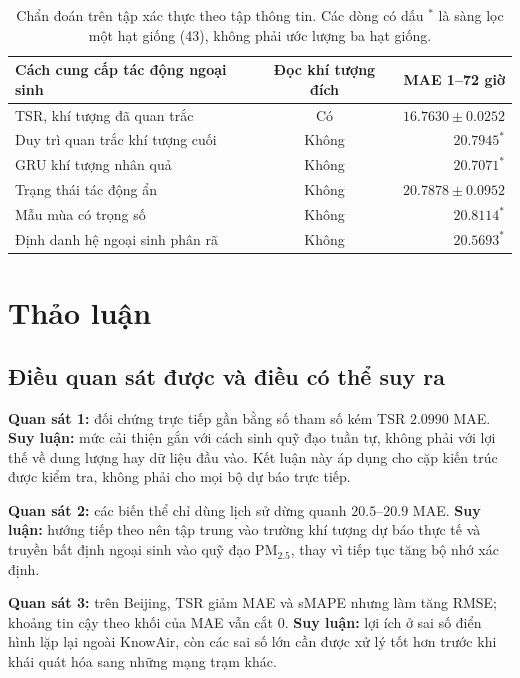 \documentclass[10pt,a4paper]{article}
\newcommand{\pmfine}{PM$_{2.5}$}
\newcommand{\modelname}{TSR}
\begin{document}
\begin{table}[H]
  \centering
  \caption{Chẩn đoán trên tập xác thực theo tập thông tin. Các dòng có dấu $^{*}$ là sàng lọc một hạt giống (43), không phải ước lượng ba hạt giống.}
  \label{tab:history-only}
  \begin{tabular}{@{}lcr@{}}
    \toprule
    Cách cung cấp tác động ngoại sinh & Đọc khí tượng đích & MAE 1--72 giờ \\
    \midrule
    \modelname{}, khí tượng đã quan trắc & Có & $16.7630\pm0.0252$ \\
    Duy trì quan trắc khí tượng cuối & Không & $20.7945^{*}$ \\
    GRU khí tượng nhân quả & Không & $20.7071^{*}$ \\
    Trạng thái tác động ẩn & Không & $20.7878\pm0.0952$ \\
    Mẫu mùa có trọng số & Không & $20.8114^{*}$ \\
    Định danh hệ ngoại sinh phân rã & Không & $20.5693^{*}$ \\
    \bottomrule
  \end{tabular}
\end{table}

\section{Thảo luận}

\subsection{Điều quan sát được và điều có thể suy ra}

\textbf{Quan sát 1:} đối chứng trực tiếp gần bằng số tham số kém \modelname{} $2.0990$ MAE. \textbf{Suy luận:} mức cải thiện gắn với cách sinh quỹ đạo tuần tự, không phải với lợi thế về dung lượng hay dữ liệu đầu vào. Kết luận này áp dụng cho cặp kiến trúc được kiểm tra, không phải cho mọi bộ dự báo trực tiếp.

\textbf{Quan sát 2:} các biến thể chỉ dùng lịch sử dừng quanh $20.5$--$20.9$ MAE. \textbf{Suy luận:} hướng tiếp theo nên tập trung vào trường khí tượng dự báo thực tế và truyền bất định ngoại sinh vào quỹ đạo \pmfine{}, thay vì tiếp tục tăng bộ nhớ xác định.

\textbf{Quan sát 3:} trên Beijing, \modelname{} giảm MAE và sMAPE nhưng làm tăng RMSE; khoảng tin cậy theo khối của MAE vẫn cắt 0. \textbf{Suy luận:} lợi ích ở sai số điển hình lặp lại ngoài KnowAir, còn các sai số lớn cần được xử lý tốt hơn trước khi khái quát hóa sang những mạng trạm khác.
\end{document}
